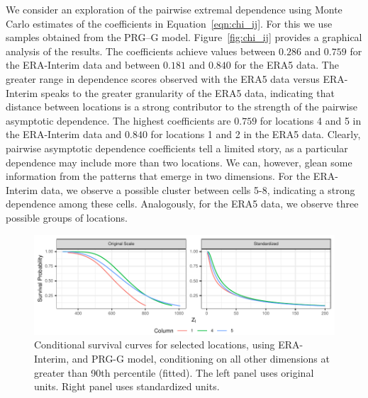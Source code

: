 We consider an exploration of the pairwise extremal dependence using Monte Carlo estimates of the 
  coefficients in  Equation~\eqref{eqn:chi_ij}. For this we use samples obtained from the PRG--G model.
  Figure~\ref{fig:chi_ij} provides a graphical analysis of the results. 
  The coefficients achieve values between $0.286$ and $0.759$ for the ERA-Interim data and 
  between $0.181$ and $0.840$ for the ERA5 data.  The greater range in dependence scores observed 
  with the ERA5 data versus ERA-Interim speaks to the greater granularity of the ERA5 data,
  indicating that distance between locations is a strong contributor to the strength of the 
  pairwise asymptotic dependence. The highest coefficients are $0.759$ for 
  locations 4 and 5 in the ERA-Interim data and
  $0.840$ for locations 1 and 2 in the ERA5 data.  Clearly, pairwise asymptotic
  dependence coefficients tell a limited story, as a particular dependence may include
  more than two locations.   We can, however, glean some information from the patterns that
  emerge in two dimensions.  For the ERA-Interim data, we observe a possible cluster 
  between cells 5-8, indicating a strong dependence among these cells.  Analogously, for
  the ERA5 data, we observe three possible groups of locations.

\begin{figure}[htb]
    \centering
    \caption{Conditional survival curves for selected locations, using ERA-Interim, and PRG-G model,  conditioning on all other dimensions at greater than 90th percentile (fitted)\label{fig:condsurv1d}. The left panel uses original units. Right panel uses standardized units.}
    \includegraphics[width=\linewidth]{./images/condsurv_1d}
\end{figure}

